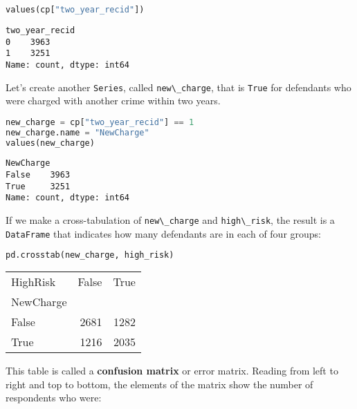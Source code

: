\begin{lstlisting}[language=Python,style=source]
values(cp["two_year_recid"])
\end{lstlisting}

\begin{lstlisting}[style=output]
two_year_recid
0    3963
1    3251
Name: count, dtype: int64
\end{lstlisting}

Let's create another \passthrough{\lstinline!Series!}, called
\passthrough{\lstinline!new\_charge!}, that is
\passthrough{\lstinline!True!} for defendants who were charged with
another crime within two years.

\begin{lstlisting}[language=Python,style=source]
new_charge = cp["two_year_recid"] == 1
new_charge.name = "NewCharge"
values(new_charge)
\end{lstlisting}

\begin{lstlisting}[style=output]
NewCharge
False    3963
True     3251
Name: count, dtype: int64
\end{lstlisting}

If we make a cross-tabulation of \passthrough{\lstinline!new\_charge!}
and \passthrough{\lstinline!high\_risk!}, the result is a
\passthrough{\lstinline!DataFrame!} that indicates how many defendants
are in each of four groups:

\begin{lstlisting}[language=Python,style=source]
pd.crosstab(new_charge, high_risk)
\end{lstlisting}

\begin{tabular}{lrr}
\midrule
HighRisk & False & True \\
NewCharge &  &  \\
\midrule
False & 2681 & 1282 \\
True & 1216 & 2035 \\
\midrule
\end{tabular}

This table is called a \textbf{confusion matrix} or error matrix.
Reading from left to right and top to bottom, the elements of the matrix
show the number of respondents who were:

